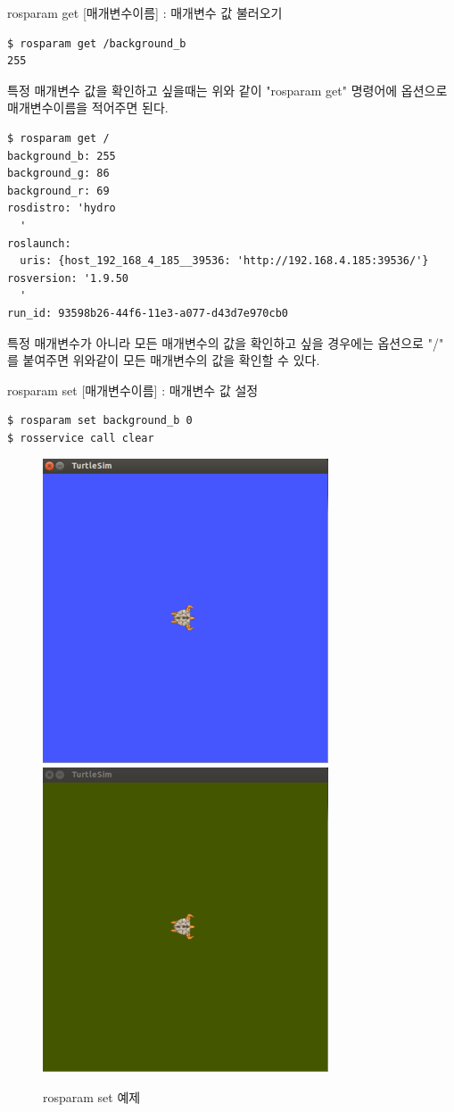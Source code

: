 \vspace{\baselineskip}
\noindent
{}\circled{\thenum} rosparam get [매개변수이름] : 매개변수 값 불러오기

\begin{lstlisting}[language=ROS]
$ rosparam get /background_b
255
\end{lstlisting}

\noindent
특정 매개변수 값을 확인하고 싶을때는 위와 같이 "rosparam get" 명령어에 옵션으로 매개변수이름을 적어주면 된다.

\begin{lstlisting}[language=ROS]
$ rosparam get /
background_b: 255
background_g: 86
background_r: 69
rosdistro: 'hydro
  '
roslaunch:
  uris: {host_192_168_4_185__39536: 'http://192.168.4.185:39536/'}
rosversion: '1.9.50
  '
run_id: 93598b26-44f6-11e3-a077-d43d7e970cb0
\end{lstlisting}

\noindent
특정 매개변수가 아니라 모든 매개변수의 값을 확인하고 싶을 경우에는 옵션으로 "/" 를 붙여주면 위와같이 모든 매개변수의 값을 확인할 수 있다.

\vspace{\baselineskip}
\noindent
{}\circled{\thenum} rosparam set [매개변수이름] : 매개변수 값 설정 

\begin{lstlisting}[language=ROS]
$ rosparam set background_b 0
$ rosservice call clear
\end{lstlisting}

\begin{figure}[h]
\centering\includegraphics[width=0.4\columnwidth]{pictures/chapter5/rosparam_set1.png}
\centering\includegraphics[width=0.4\columnwidth]{pictures/chapter5/rosparam_set2.png}
\caption{rosparam set 예제}
\end{figure}

